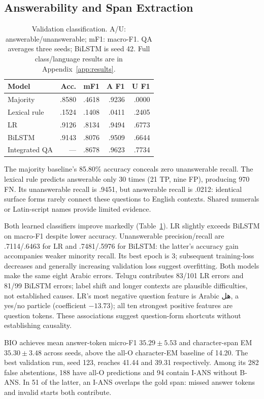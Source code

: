 \documentclass[11pt]{article}
\newcommand{\AR}[1]{{\arabicfont\beginR #1\endR}}
\begin{document}
\subsection{Answerability and Span Extraction}
\begin{table}[t]
\centering\small\setlength{\tabcolsep}{4pt}
\begin{tabular}{lrrrr}
\toprule
Model & Acc. & mF1 & A F1 & U F1\\
\midrule
Majority & .8580 & .4618 & .9236 & .0000\\
Lexical rule & .1524 & .1408 & .0411 & .2405\\
LR & .9126 & .8134 & .9494 & .6773\\
BiLSTM & .9143 & .8076 & .9509 & .6644\\
Integrated QA & --- & .8678 & .9623 & .7734\\
\bottomrule
\end{tabular}
\caption{Validation classification. A/U: answerable/unanswerable; mF1: macro-F1. QA averages three seeds; BiLSTM is seed 42. Full class/language results are in Appendix~\ref{app:results}.}
\label{tab:class}
\end{table}
The majority baseline's 85.80\% accuracy conceals zero unanswerable recall. The lexical rule predicts answerable only 30 times (21 TP, nine FP), producing 970 FN. Its unanswerable recall is .9451, but answerable recall is .0212: identical surface forms rarely connect these questions to English contexts. Shared numerals or Latin-script names provide limited evidence.

Both learned classifiers improve markedly (Table~\ref{tab:class}). LR slightly exceeds BiLSTM on macro-F1 despite lower accuracy. Unanswerable precision/recall are .7114/.6463 for LR and .7481/.5976 for BiLSTM: the latter's accuracy gain accompanies weaker minority recall. Its best epoch is 3; subsequent training-loss decreases and generally increasing validation loss suggest overfitting. Both models make the same eight Arabic errors. Telugu contributes 83/101 LR errors and 81/99 BiLSTM errors; label shift and longer contexts are plausible difficulties, not established causes. LR's most negative question feature is Arabic \AR{هل}, a yes/no particle (coefficient $-13.73$); all ten strongest positive features are question tokens. These associations suggest question-form shortcuts without establishing causality.

BIO achieves mean answer-token micro-F1 $35.29\pm5.53$ and character-span EM $35.30\pm3.48$ across seeds, above the all-O character-EM baseline of 14.20. The best validation run, seed 123, reaches 41.44 and 39.31 respectively. Among its 282 false abstentions, 188 have all-O predictions and 94 contain I-ANS without B-ANS. In 51 of the latter, an I-ANS overlaps the gold span: missed answer tokens and invalid starts both contribute.
\end{document}
